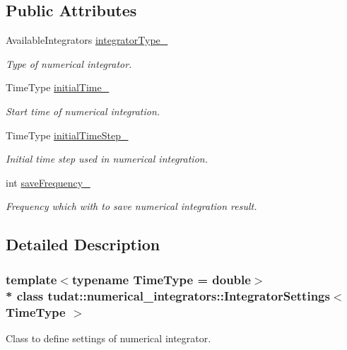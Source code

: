 \subsection*{Public Attributes}
\begin{DoxyCompactItemize}
\item 
Available\+Integrators \hyperlink{classtudat_1_1numerical__integrators_1_1IntegratorSettings_ab1fa0bf04bb06c5fee5a84bef7243ce4}{integrator\+Type\+\_\+}
\begin{DoxyCompactList}\small\item\em Type of numerical integrator. \end{DoxyCompactList}\item 
Time\+Type \hyperlink{classtudat_1_1numerical__integrators_1_1IntegratorSettings_ade260f7c4ac8183e011b7c46f17fdcb4}{initial\+Time\+\_\+}
\begin{DoxyCompactList}\small\item\em Start time of numerical integration. \end{DoxyCompactList}\item 
Time\+Type \hyperlink{classtudat_1_1numerical__integrators_1_1IntegratorSettings_ad97592b354b94c4e3d74f4e5579c8b14}{initial\+Time\+Step\+\_\+}
\begin{DoxyCompactList}\small\item\em Initial time step used in numerical integration. \end{DoxyCompactList}\item 
int \hyperlink{classtudat_1_1numerical__integrators_1_1IntegratorSettings_a6d823e9354ad993a0605cf28fa85dd8b}{save\+Frequency\+\_\+}
\begin{DoxyCompactList}\small\item\em Frequency which with to save numerical integration result. \end{DoxyCompactList}\end{DoxyCompactItemize}


\subsection{Detailed Description}
\subsubsection*{template$<$typename Time\+Type = double$>$\\*
class tudat\+::numerical\+\_\+integrators\+::\+Integrator\+Settings$<$ Time\+Type $>$}

Class to define settings of numerical integrator. 

